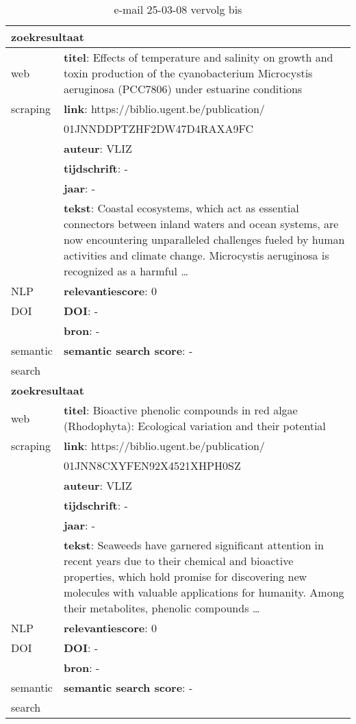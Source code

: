 \begin{table}[h!]
    \caption{e-mail 25-03-08 vervolg bis}
    \centering
    \begin{tabularx}{\textwidth}{|p{4cm}|X|} 
        \hline
        \multicolumn{2}{|X|}{\textbf{zoekresultaat}} \\
        \hline
        web &\textbf{titel}: Effects of temperature and salinity on growth and toxin production of the cyanobacterium Microcystis aeruginosa (PCC7806) under estuarine conditions\\
        scraping&\textbf{link}: https://biblio.ugent.be/publication/\\&01JNNDDPTZHF2DW47D4RAXA9FC\\
        &\textbf{auteur}: VLIZ\\
        &\textbf{tijdschrift}: -\\
        &\textbf{jaar}: -\\
        &\textbf{tekst}: Coastal ecosystems, which act as essential connectors between inland waters and ocean systems, are now encountering unparalleled challenges fueled by human activities and climate change. Microcystis aeruginosa is recognized as a harmful …\\
        \hline
        NLP&\textbf{relevantiescore}: 0\\
        \hline
        DOI&\textbf{DOI}: -\\
        &\textbf{bron}: -\\
        \hline
        semantic&\textbf{semantic search score}: -\\
        search&\\
        \hline
        \multicolumn{2}{|X|}{\textbf{zoekresultaat}} \\
        \hline
        web &\textbf{titel}: Bioactive phenolic compounds in red algae (Rhodophyta): Ecological variation and their potential\\
        scraping&\textbf{link}: https://biblio.ugent.be/publication/\\&01JNN8CXYFEN92X4521XHPH0SZ\\
        &\textbf{auteur}: VLIZ\\
        &\textbf{tijdschrift}: -\\
        &\textbf{jaar}: -\\
        &\textbf{tekst}: Seaweeds have garnered significant attention in recent years due to their chemical and bioactive properties, which hold promise for discovering new molecules with valuable applications for humanity. Among their metabolites, phenolic compounds …\\
        \hline
        NLP&\textbf{relevantiescore}: 0\\
        \hline
        DOI&\textbf{DOI}: -\\
        &\textbf{bron}: -\\
        \hline
        semantic&\textbf{semantic search score}: -\\
        search&\\
        \hline
    \end{tabularx}
    \label{table:email20250308vervolgbis}
\end{table}
